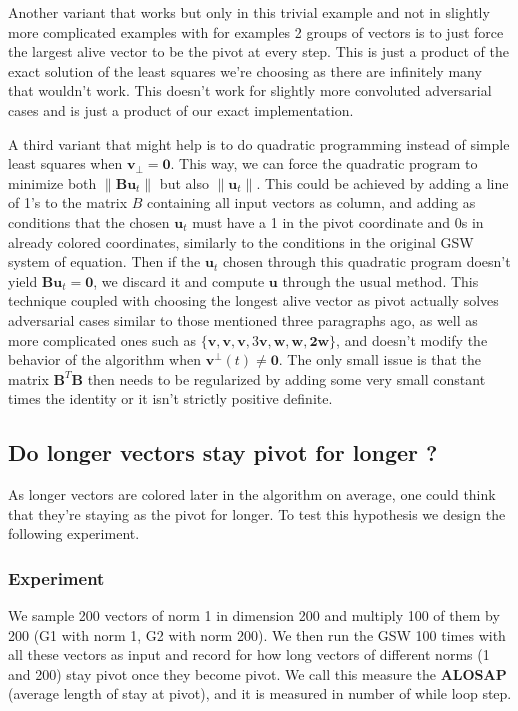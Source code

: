 \documentclass[12pt]{article}
\begin{document}
Another variant that works but only in this trivial example and not in slightly more complicated examples with for examples 2 groups of vectors is to just force the largest alive vector to be the pivot at every step. This is just a product of the exact solution of the least squares we're choosing as there are infinitely many that wouldn't work. This doesn't work for slightly more convoluted adversarial cases and is just a product of our exact implementation.

A third variant that might help is to do quadratic programming instead of simple least squares when $\textbf{v}_\perp=\textbf{0}$. This way, we can force the quadratic program to minimize both $\|\textbf{Bu}_t\|$ but also $\|\textbf{u}_t\|$. This could be achieved by adding a line of 1's to the matrix $B$ containing all input vectors as column, and adding as conditions that the chosen $\textbf{u}_t$ must have a 1 in the pivot coordinate and 0s in already colored coordinates, similarly to the conditions in the original GSW system of equation. Then if the $\textbf{u}_t$ chosen through this quadratic program doesn't yield $\textbf{Bu}_t=\textbf{0}$, we discard it and compute $\textbf{u}$ through the usual method. This technique coupled with choosing the longest alive vector as pivot actually solves adversarial cases similar to those mentioned three paragraphs ago, as well as more complicated ones such as $\{\textbf{v},\textbf{v},\textbf{v},3\textbf{v},\textbf{w},\textbf{w},\textbf{2w}\}$, and doesn't modify the behavior of the algorithm when $\textbf{v}^\perp(t)\not=\textbf{0}$. The only small issue is that the matrix $\textbf{B}^T\textbf{B}$ then needs to be regularized by adding some very small constant times the identity or it isn't strictly positive definite.


\subsection{Do longer vectors stay pivot for longer ?}\label{longer_vec_pivot_longer}
As longer vectors are colored later in the algorithm on average, one could think that they're staying as the pivot for longer. To test this hypothesis we design the following experiment.
\subsubsection{Experiment}
We sample 200 vectors of norm 1 in dimension 200 and multiply 100 of them by 200 (G1 with norm 1, G2 with norm 200). We then run the GSW 100 times with all these vectors as input and record for how long vectors of different norms (1 and 200) stay pivot once they become pivot. We call this measure the \textbf{ALOSAP} (average length of stay at pivot), and it is measured in number of while loop step.
\end{document}
